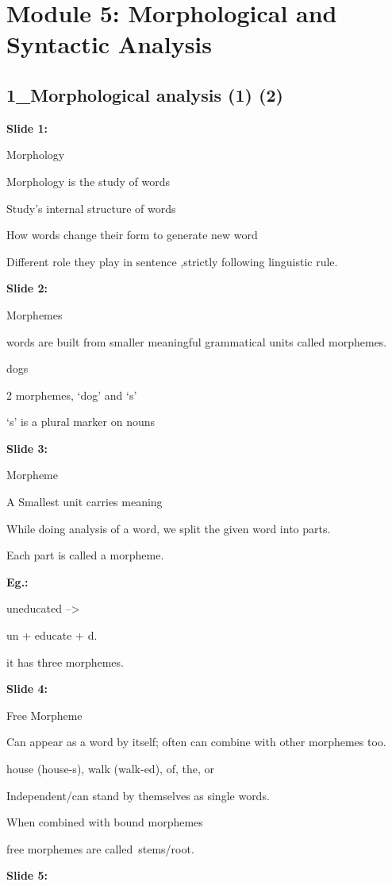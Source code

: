 \documentclass[11pt,a4paper]{article}
\begin{document}
\section{Module 5: Morphological and Syntactic Analysis}


\subsection{1_Morphological analysis (1) (2)}

\textbf{Slide 1:}

Morphology

Morphology is the study of words

Study's internal structure of words

How words change their form to generate new word

Different role they play in sentence ,strictly following linguistic rule.

\textbf{Slide 2:}

Morphemes

words are built from smaller meaningful grammatical units called morphemes.

dogs

2 morphemes, ‘dog’ and ‘s’

‘s’ is a plural marker on nouns

\textbf{Slide 3:}

Morpheme

A Smallest unit carries meaning

While doing analysis of a word, we split the given word into parts.

Each part is called a morpheme.

\textbf{Eg.:} 

uneducated –>

un + educate + d.

it has three morphemes.

\textbf{Slide 4:}

Free Morpheme

Can appear as a word by itself; often can combine with other morphemes too.

house (house-s), walk (walk-ed), of, the, or

Independent/can stand by themselves as single words.

When combined with bound morphemes

free morphemes are called stems/root.

\textbf{Slide 5:}
\end{document}
